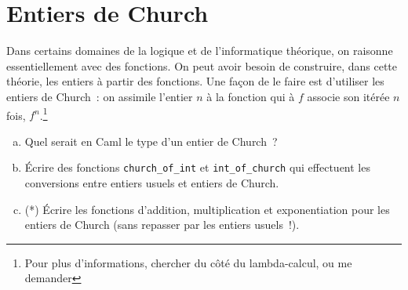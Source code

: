 \documentclass[10pt,a4paper]{article}
\begin{document}
\section{Entiers de Church}
Dans certains domaines de la logique et de l'informatique théorique, on raisonne essentiellement avec des fonctions. On peut avoir besoin de construire, dans cette théorie, les entiers à partir des fonctions. Une façon de le faire est d'utiliser les entiers de Church~: on assimile l'entier $n$ à la fonction qui à $f$ associe son itérée $n$ fois, $f^n$.\footnote{Pour plus d'informations, chercher du côté du lambda-calcul, ou me demander}
\begin{enumerate}[a)]
\item Quel serait en Caml le type d'un entier de Church~?
\item Écrire des fonctions \texttt{church\_of\_int} et \texttt{int\_of\_church} qui effectuent les conversions entre entiers usuels et entiers de Church.
\item (*) Écrire les fonctions d'addition, multiplication et exponentiation pour les entiers de Church (sans repasser par les entiers usuels~!).
\end{enumerate}
\end{document}
